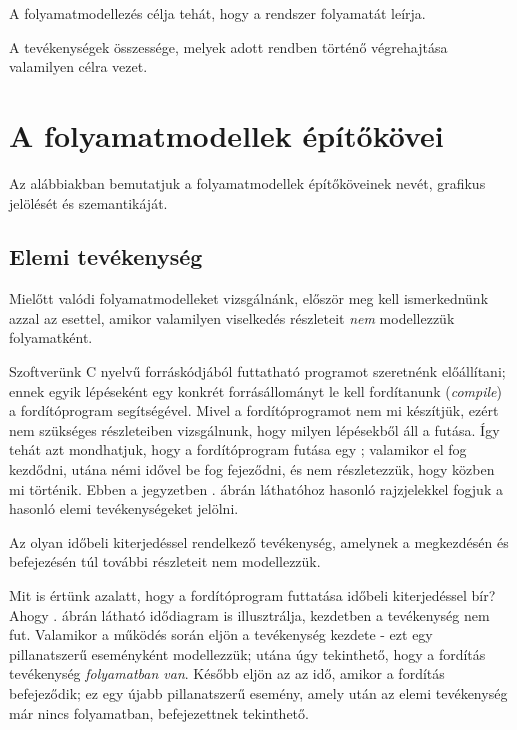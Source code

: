 A folyamatmodellezés célja tehát, hogy a rendszer folyamatát leírja.

\begin{definicio}
	A  tevékenységek összessége, melyek adott rendben történő végrehajtása valamilyen célra vezet.
\end{definicio}

\section{A folyamatmodellek építőkövei}

Az alábbiakban bemutatjuk a folyamatmodellek építőköveinek nevét, grafikus jelölését és szemantikáját.

\subsection{Elemi tevékenység}

Mielőtt valódi folyamatmodelleket vizsgálnánk, először meg kell ismerkednünk azzal az esettel, amikor valamilyen viselkedés részleteit \emph{nem} modellezzük folyamatként.

\begin{pelda}
Szoftverünk C nyelvű forráskódjából futtatható programot szeretnénk előállítani; ennek egyik lépéseként egy konkrét forrásállományt le kell fordítanunk (\emph{compile}) a fordítóprogram segítségével. Mivel a fordítóprogramot nem mi készítjük, ezért nem szükséges részleteiben vizsgálnunk, hogy milyen lépésekből áll a futása. Így tehát azt mondhatjuk, hogy a fordítóprogram futása egy ; valamikor el fog kezdődni, utána némi idővel be fog fejeződni, és nem részletezzük, hogy közben mi történik. Ebben a jegyzetben . ábrán láthatóhoz hasonló rajzjelekkel fogjuk a hasonló elemi tevékenységeket jelölni.
\end{pelda}

\begin{definicio}
	Az  olyan időbeli kiterjedéssel rendelkező tevékenység, amelynek a megkezdésén és befejezésén túl további részleteit nem modellezzük.
\end{definicio}


\begin{pelda}
Mit is értünk azalatt, hogy a fordítóprogram futtatása időbeli kiterjedéssel bír? Ahogy . ábrán látható idődiagram is illusztrálja, kezdetben a tevékenység nem fut. Valamikor a működés során eljön a tevékenység kezdete - ezt egy pillanatszerű eseményként modellezzük; utána úgy tekinthető, hogy a fordítás tevékenység \emph{folyamatban van}. Később eljön az az idő, amikor a fordítás befejeződik; ez egy újabb pillanatszerű esemény, amely után az elemi tevékenység már nincs folyamatban, befejezettnek tekinthető.
\end{pelda}

